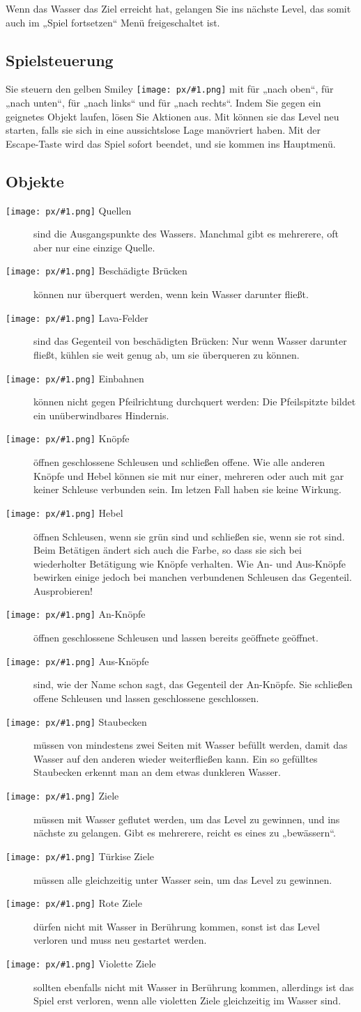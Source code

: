 \documentclass[oneside,12pt]{scrartcl}
\newcommand{\object}[2]{\item[\texttt{[image: px/\#1.png]} #2]}
\newcommand{\inlpx}[1]{\texttt{[image: px/\#1.png]}}
\begin{document}
Wenn das Wasser das Ziel erreicht hat, gelangen Sie ins nächste Level, das somit auch im „Spiel fortsetzen“ Menü freigeschaltet ist.

\subsection{Spielsteuerung}
Sie steuern den gelben Smiley \inlpx{player} mit  für „nach oben“,  für „nach unten“,  für „nach links“ und  für „nach rechts“. Indem Sie gegen ein geignetes Objekt laufen, lösen Sie Aktionen aus. Mit  können sie das Level neu starten, falls sie sich in eine aussichtslose Lage manövriert haben. Mit der Escape-Taste \Esc wird das Spiel sofort beendet, und sie kommen ins Hauptmenü.

\subsection{Objekte}
\begin{description}
\object{fount}{Quellen} sind die Ausgangspunkte des Wassers. Manchmal gibt es mehrerere, oft aber nur eine einzige Quelle.
\object{bridge_low}{Beschädigte Brücken} können nur überquert werden, wenn kein Wasser darunter fließt.
\object{lava_passage}{Lava-Felder} sind das Gegenteil von beschädigten Brücken: Nur wenn Wasser darunter fließt, kühlen sie weit genug ab, um sie überqueren zu können.
\object{oneway}{Einbahnen} können nicht gegen Pfeilrichtung durchquert werden: Die Pfeilspitzte bildet ein 
	unüberwindbares Hindernis.
\object{button_toggle}{Knöpfe} öffnen geschlossene Schleusen und schließen offene. Wie alle anderen Knöpfe und Hebel können sie mit nur einer, mehreren oder auch mit gar keiner Schleuse verbunden sein. Im letzen Fall haben sie keine Wirkung.
\object{lever}{Hebel} öffnen Schleusen, wenn sie grün sind und schließen sie, wenn sie rot sind. Beim Betätigen ändert sich auch die Farbe, so dass sie sich bei wiederholter Betätigung wie Knöpfe verhalten. Wie An- und Aus-Knöpfe bewirken einige jedoch bei manchen verbundenen Schleusen das Gegenteil. Ausprobieren!
\object{button_on}{An-Knöpfe} öffnen geschlossene Schleusen und lassen bereits geöffnete geöffnet.
\object{button_off}{Aus-Knöpfe} sind, wie der Name schon sagt, das Gegenteil der An-Knöpfe. Sie schließen offene  Schleusen und lassen geschlossene geschlossen.
\object{fount_and_closed}{Staubecken} müssen von mindestens zwei Seiten mit Wasser befüllt werden, damit das Wasser auf den anderen wieder weiterfließen kann. Ein so gefülltes Staubecken erkennt man an dem etwas dunkleren Wasser.
\object{goal}{Ziele} müssen mit Wasser geflutet werden, um das Level zu gewinnen, und ins nächste zu gelangen. Gibt es mehrerere, reicht es eines zu „bewässern“.
\object{goal_part}{Türkise Ziele} müssen alle gleichzeitig unter Wasser sein, um das Level zu gewinnen.
\object{goal_lose}{Rote Ziele} dürfen nicht mit Wasser in Berührung kommen, sonst ist das Level verloren und muss neu gestartet werden.
\object{goal_lose_part}{Violette Ziele} sollten ebenfalls nicht mit Wasser in Berührung kommen, allerdings ist das Spiel erst verloren, wenn alle violetten Ziele gleichzeitig im Wasser sind.
\end{description}
\end{document}
